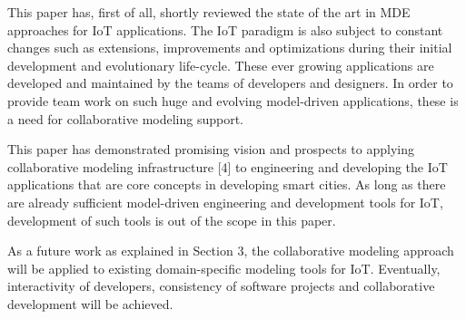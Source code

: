 This paper has, first of all, shortly reviewed the state of the art in MDE approaches for IoT applications. The IoT paradigm is also subject to constant changes such as extensions, improvements and optimizations during their initial development and evolutionary life-cycle. These ever growing applications are developed and maintained by the teams of developers and designers. In order to provide team work on such huge and evolving model-driven applications, these is a need for collaborative modeling support.

This paper has demonstrated promising vision and prospects to applying collaborative modeling infrastructure [4] to engineering and developing the IoT applications that are core concepts in developing smart cities. As long as there are already sufficient model-driven engineering and development tools for IoT, development of such tools is out of the scope in this paper.

As a future work as explained in Section 3, the collaborative modeling approach will be applied to existing domain-specific modeling tools for IoT. Eventually, interactivity of developers, consistency of software projects and collaborative development will be achieved. 